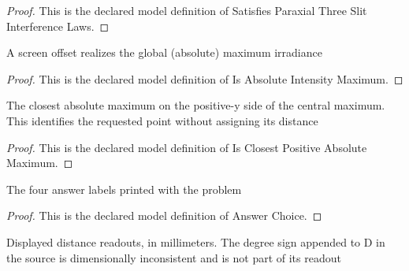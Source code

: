 \begin{proof}
  This is the declared model definition of Satisfies Paraxial Three Slit Interference Laws.
\end{proof}
\begin{definition}
  \label{def:physics:phyx-mini-0120:phyxminiproblems-problemphyxmini0120-isabsoluteintensitymaximum}
  A screen offset realizes the global (absolute) maximum irradiance
\end{definition}
\begin{proof}
  This is the declared model definition of Is Absolute Intensity Maximum.
\end{proof}
\begin{definition}
  \label{def:physics:phyx-mini-0120:phyxminiproblems-problemphyxmini0120-isclosestpositiveabsolutemaximum}
  The closest absolute maximum on the positive-y side of the central maximum. This identifies the requested point without assigning its distance
\end{definition}
\begin{proof}
  This is the declared model definition of Is Closest Positive Absolute Maximum.
\end{proof}
\begin{definition}
  \label{def:physics:phyx-mini-0120:phyxminiproblems-problemphyxmini0120-answerchoice}
  The four answer labels printed with the problem
\end{definition}
\begin{proof}
  This is the declared model definition of Answer Choice.
\end{proof}
\begin{definition}
  \label{def:physics:phyx-mini-0120:phyxminiproblems-problemphyxmini0120-displayeddistancemillimeters}
  Displayed distance readouts, in millimeters. The degree sign appended to D in the source is dimensionally inconsistent and is not part of its readout
\end{definition}
